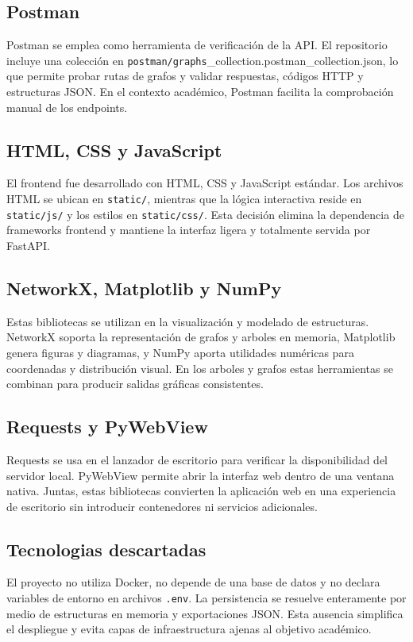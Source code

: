 \documentclass[12pt,onecolumn]{IEEEtran}
\begin{document}
\subsection{Postman}
Postman se emplea como herramienta de verificación de la API. El repositorio incluye una colección en \texttt{postman/graphs}\_collection.postman\_collection.json, lo que permite probar rutas de grafos y validar respuestas, códigos HTTP y estructuras JSON. En el contexto académico, Postman facilita la comprobación manual de los endpoints.

\subsection{HTML, CSS y JavaScript}
El frontend fue desarrollado con HTML, CSS y JavaScript estándar. Los archivos HTML se ubican en \texttt{static/}, mientras que la lógica interactiva reside en \texttt{static/js/} y los estilos en \texttt{static/css/}. Esta decisión elimina la dependencia de frameworks frontend y mantiene la interfaz ligera y totalmente servida por FastAPI.

\subsection{NetworkX, Matplotlib y NumPy}
Estas bibliotecas se utilizan en la visualización y modelado de estructuras. NetworkX soporta la representación de grafos y arboles en memoria, Matplotlib genera figuras y diagramas, y NumPy aporta utilidades numéricas para coordenadas y distribución visual. En los arboles y grafos estas herramientas se combinan para producir salidas gráficas consistentes.

\subsection{Requests y PyWebView}
Requests se usa en el lanzador de escritorio para verificar la disponibilidad del servidor local. PyWebView permite abrir la interfaz web dentro de una ventana nativa. Juntas, estas bibliotecas convierten la aplicación web en una experiencia de escritorio sin introducir contenedores ni servicios adicionales.

\subsection{Tecnologias descartadas}
El proyecto no utiliza Docker, no depende de una base de datos y no declara variables de entorno en archivos \texttt{.env}. La persistencia se resuelve enteramente por medio de estructuras en memoria y exportaciones JSON. Esta ausencia simplifica el despliegue y evita capas de infraestructura ajenas al objetivo académico.
\end{document}
